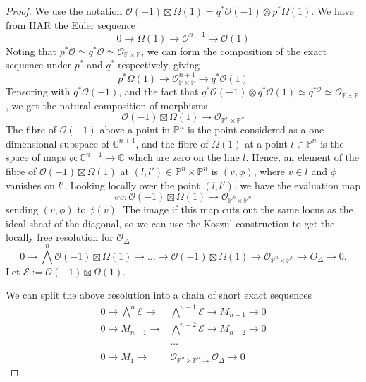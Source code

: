 \begin{proof}
We use the notation $\mathcal{O}(-1)\boxtimes \Omega (1) = q^{*}\mathcal{O}(-1)\otimes p^{*}\Omega (1)$. We have from HAR the Euler sequence $$0 \to \Omega(1)\to \mathcal{O}^{n+1}\to \mathcal{O}(1)$$
Noting that $p^{*}\mathcal{O} \simeq q^{*}\mathcal{O} \simeq \mathcal{O}_{\mathbb{P}\times \mathbb{P}}$, we can form the composition of the exact sequence under $p^*$ and $q^*$ respectively, giving $$p^{*}\Omega (1)\to \mathcal{O}_{\mathbb{P}\times \mathbb{P}}^{n+1} \to q^{*}\mathcal{O}(1)$$
Tensoring with $q^{*}\mathcal{O}(-1)$, and the fact that $q^{*}\mathcal{O}(-1) \otimes q^{*}\mathcal{O}(1) \simeq q^{*\mathcal{O}}\simeq \mathcal{O}_{\mathbb{P}\times \mathbb{P}}$, we get the natural composition of morphisms $$\mathcal{O}(-1)\boxtimes \Omega(1) \to \mathcal{O}_{\mathbb{P}^{n}\times \mathbb{P}^n}$$
The fibre of $\mathcal{O}(-1)$ above a point in $\mathbb{P}^n$ is the point considered as a one-dimensional subspace of $\mathbb{C}^{n+1}$, and the fibre of $\Omega (1)$ at a point $l \in \mathbb{P}^n$ is the space of maps $\phi : \mathbb{C}^{n+1}\to \mathbb{C}$ which are zero on the line $l$. Hence, an element of the fibre of  $\mathcal{O}(-1)\boxtimes \Omega (1)$ at $(l,l') \in \mathbb{P}^{n}\times \mathbb{P}^n$ is $(v,\phi)$, where $v \in l$ and $\phi$ vanishes on $l'$. Looking locally over the point $(l,l')$, we have the evaluation map $$ev: \mathcal{O}(-1)\boxtimes \Omega (1) \to \mathcal{O}_{\mathbb{P}^{n}\times \mathbb{P}^{n}}$$ 
sending $(v,\phi)$ to $\phi(v)$. The image if this map cuts out the same locus as the ideal sheaf of the diagonal, so we can use the Koszul construction to get the locally free resolution for $\mathcal{O}_\Delta$$$
0 \to \bigwedge^{n}\mathcal{O}(-1)\boxtimes\Omega(1) \to \dots\to \mathcal{O}(-1)\boxtimes\Omega(1)\to \mathcal{O}_{\mathbb{P}^{n}\times \mathbb{P}^{n}} \to O_{\Delta}\to 0.
$$
Let $\mathcal{E} :=\mathcal{O}(-1)\boxtimes\Omega(1)$. 

We can split the above resolution into a chain of short exact sequences
$$
\begin{align}
0 \to \bigwedge^{n}\mathcal{E} \to &\bigwedge^{n-1}\mathcal{E}\to M_{n-1}\to 0  \\
0\to M_{n-1}\to & \bigwedge^{n-2}\mathcal{E}\to M_{n-2}\to 0  \\  \\
&\dots \\  \\
0\to M_{1}\to &\mathcal{O}_{\mathbb{P}^{n}\times \mathbb{P}^{n}\to}\mathcal{O}_{\Delta}\to 0
\end{align}
$$


\end{proof}
